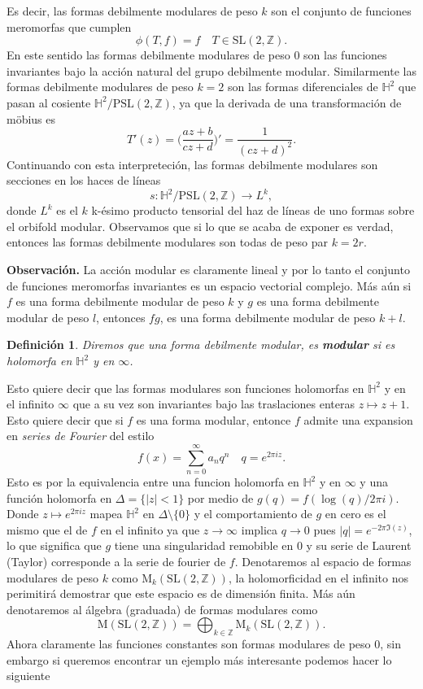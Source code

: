 \documentclass[letterpaper]{article}
\newtheorem{def.}{Definici\'on}[section]
\newcommand{\zah}{\ensuremath{ \mathbb Z }}
\newcommand{\obs}{{\noindent \sc \textbf{Observación. }}}
\newcommand{\pslz}{\ensuremath{\mathrm{PSL}(2,\mathbb Z) }}
\newcommand{\hd}{\ensuremath{\mathbb H^2}}
\newcommand{\slz}{\ensuremath{\mathrm{SL}(2,\mathbb Z) }}
\newcommand{\mdlr}{\ensuremath{\mathrm{M}}}
\begin{document}
Es decir, las formas debilmente modulares de peso \(k\) son el conjunto de funciones meromorfas que cumplen
\[
    \phi(T,f)=f\quad T\in\slz.
\]
En este sentido las formas debilmente modulares de peso \(0\) son las funciones invariantes bajo la acción natural del grupo debilmente modular. Similarmente las formas debilmente modulares de peso \(k=2\) son las formas diferenciales de \(\hd\) que pasan al cosiente \(\hd/\pslz\), ya que la derivada de una transformación de möbius es
\[
    T'(z)=\Big(\frac{az+b}{cz+d}\Big)'=\frac{1}{(cz+d)^2}.
\]
Continuando con esta interpreteción, las formas debilmente modulares son secciones en los haces de líneas
\[
    s:\hd/\pslz\rightarrow L^{k},
\]
donde \(L^k\) es el \(k\) k-ésimo producto tensorial del haz de líneas de uno formas sobre el orbifold modular. Observamos que si lo que se acaba de exponer es verdad, entonces las formas debilmente modulares son todas de peso par \(k=2r\).

\obs La acción modular es claramente lineal y por lo tanto el conjunto de funciones meromorfas invariantes es un espacio vectorial complejo. Más aún si \(f\) es una forma debilmente modular de peso \(k\) y \(g\) es una forma debilmente modular de peso \(l\), entonces \(fg\), es una forma debilmente modular de peso \(k+l\).
\begin{def.}
Diremos que una forma debilmente modular, es \textbf{modular} si es holomorfa en \(\hd\) y en \(\infty\).
\end{def.}
Esto quiere decir que las formas modulares son funciones holomorfas en \(\hd\) y en el infinito \(\infty\) que a su vez son invariantes bajo las traslaciones enteras \(z\mapsto z+1\). Esto quiere decir que si \(f\) es una forma modular, entonce \(f\) admite una expansion en \emph{series de Fourier} del estilo
\[
    f(x)=\sum^{\infty}_{n=0}a_nq^{n}\quad q=e^{2\pi iz}.
\]
Esto es por la equivalencia entre una funcion holomorfa en \(\hd\) y en \(\infty\) y una función holomorfa en \(\Delta=\{|z|< 1\}\) por medio de \(g(q)=f(\log(q)/2\pi i)\). Donde \(z\mapsto e^{2\pi i z}\) mapea \(\hd\) en \(\Delta\setminus\{0\}\) y el comportamiento de \(g\) en cero es el mismo que el de \(f\) en el infinito ya que \(z\rightarrow\infty\) implica \(q\rightarrow 0\) pues \(|q|=e^{-2\pi\Im(z)}\), lo que significa que \(g\) tiene una singularidad remobible en \(0\) y su serie de Laurent (Taylor) corresponde a la serie de fourier de \(f\).
Denotaremos al espacio de formas modulares de peso \(k\) como \(\mdlr_{k}(\slz)\), la holomorficidad en el infinito nos perimitirá demostrar que este espacio es de dimensión finita. Más aún denotaremos al álgebra (graduada) de formas modulares como
\[
    \mdlr(\slz)=\bigoplus_{k\in\zah}\mdlr_{k}(\slz).
\]
Ahora claramente las funciones constantes son formas modulares de peso \(0\), sin embargo si queremos encontrar un ejemplo más interesante podemos hacer lo siguiente
\end{document}
